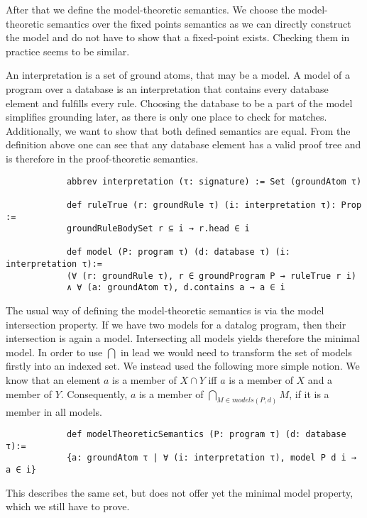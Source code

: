 \documentclass{article}
\begin{document}
        After that we define the model-theoretic semantics. We choose the model-theoretic semantics over the fixed points semantics as we can directly construct the model and do not have to show that a fixed-point exists. Checking them in practice seems to be similar. 

        An interpretation is a set of ground atoms, that may be a model. A model of a program over a database is an interpretation that contains every database element and fulfills every rule. Choosing the database to be a part of the model simplifies grounding later, as there is only one place to check for matches. Additionally, we want to show that both defined semantics are equal. From the definition above one can see that any database element has a valid proof tree and is therefore in the proof-theoretic semantics.

        \begin{lstlisting}
            abbrev interpretation (τ: signature) := Set (groundAtom τ)

            def ruleTrue (r: groundRule τ) (i: interpretation τ): Prop := 
            groundRuleBodySet r ⊆ i → r.head ∈ i

            def model (P: program τ) (d: database τ) (i: interpretation τ):= 
            (∀ (r: groundRule τ), r ∈ groundProgram P → ruleTrue r i) 
            ∧ ∀ (a: groundAtom τ), d.contains a → a ∈ i
        \end{lstlisting}

        The usual way of defining the model-theoretic semantics is via the model intersection property. If we have two models for a datalog program, then their intersection is again a model. Intersecting all models yields therefore the minimal model. In order to use $\bigcap$ in lead we would need to transform the set of models firstly into an indexed set. We instead used the following more simple notion. We know that an element $a$ is a member of $X \cap Y$ iff $a$ is a member of $X$ and a member of $Y$. Consequently, $a$ is a member of $\bigcap_{M \in models(P,d)} M $, if it is a member in all models.

        \begin{lstlisting}
            def modelTheoreticSemantics (P: program τ) (d: database τ):= 
            {a: groundAtom τ | ∀ (i: interpretation τ), model P d i → a ∈ i}
        \end{lstlisting}

        This describes the same set, but does not offer yet the minimal model property, which we still have to prove.
\end{document}
